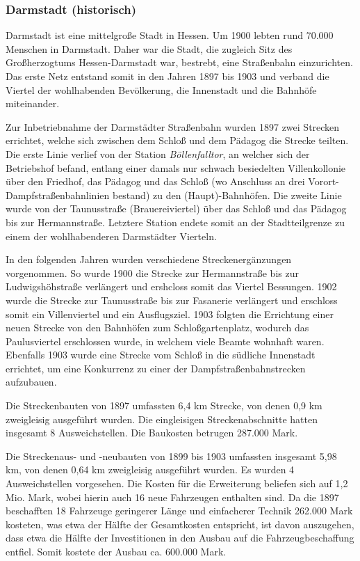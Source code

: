 \subsubsection*{Darmstadt (historisch)}

Darmstadt ist eine mittelgroße Stadt in Hessen. Um 1900 lebten rund 70.000 Menschen in
Darmstadt. Daher war die Stadt, die zugleich Sitz des Großherzogtums Hessen-Darmstadt
war, bestrebt, eine Straßenbahn einzurichten. Das erste Netz entstand somit in den
Jahren 1897 bis 1903 und verband die Viertel der wohlhabenden Bevölkerung, die
Innenstadt und die Bahnhöfe miteinander.

Zur Inbetriebnahme der Darmstädter Straßenbahn wurden 1897 zwei Strecken errichtet,
welche sich zwischen dem Schloß und dem Pädagog die Strecke teilten. Die erste Linie
verlief von der Station \emph{Böllenfalltor}, an welcher sich der Betriebshof befand, entlang
einer damals nur schwach besiedelten Villenkollonie über den Friedhof, das Pädagog und
das Schloß (wo Anschluss an drei Vorort-Dampfstraßenbahnlinien bestand) zu den
(Haupt)-Bahnhöfen. Die zweite Linie wurde von der Taunusstraße (Brauereiviertel) über das
Schloß und das Pädagog bis zur Hermannstraße. Letztere Station endete somit an der
Stadtteilgrenze zu einem der wohlhabenderen Darmstädter Vierteln.

In den folgenden Jahren wurden verschiedene Streckenergänzungen vorgenommen. So wurde
1900 die Strecke zur Hermannstraße bis zur Ludwigshöhstraße verlängert und ershcloss
somit das Viertel Bessungen. 1902 wurde die Strecke zur Taunusstraße bis zur Fasanerie
verlängert und erschloss somit ein Villenviertel und ein Ausflugsziel. 1903 folgten die
Errichtung einer neuen Strecke von den Bahnhöfen zum Schloßgartenplatz, wodurch das
Paulusviertel erschlossen wurde, in welchem viele Beamte wohnhaft waren. Ebenfalls 1903
wurde eine Strecke vom Schloß in die südliche Innenstadt errichtet, um eine Konkurrenz zu
einer der Dampfstraßenbahnstrecken aufzubauen.

Die Streckenbauten von 1897 umfassten 6,4 km Strecke, von denen 0,9 km zweigleisig
ausgeführt wurden. Die eingleisigen Streckenabschnitte hatten insgesamt 8 Ausweichstellen.
Die Baukosten betrugen 287.000 Mark.

Die Streckenaus- und -neubauten von 1899 bis 1903 umfassten insgesamt 5,98 km, von denen
0,64 km zweigleisig ausgeführt wurden. Es wurden 4 Ausweichstellen vorgesehen. Die Kosten
für die Erweiterung beliefen sich auf 1,2 Mio. Mark, wobei hierin auch 16 neue Fahrzeugen
enthalten sind. Da die 1897 beschafften 18 Fahrzeuge geringerer Länge und einfacherer
Technik 262.000 Mark kosteten, was etwa der Hälfte der Gesamtkosten entspricht, ist davon
auszugehen, dass etwa die Hälfte der Investitionen in den Ausbau auf die
Fahrzeugbeschaffung entfiel. Somit kostete der Ausbau ca. 600.000 Mark.

